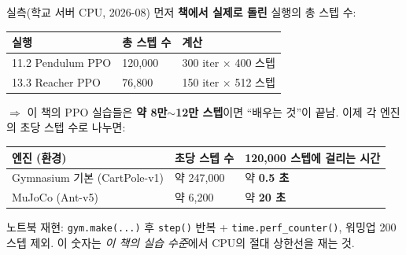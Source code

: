 \begin{frame}{실측(학교 서버 CPU, 2026-08)}
  먼저 \textbf{책에서 실제로 돌린} 실행의 총 스텝 수:
  \small
  \begin{tabular}{@{}p{4.4cm}p{3.0cm}p{6.0cm}@{}}
    \toprule
    실행 & 총 스텝 수 & 계산 \\
    \midrule
    11.2 Pendulum PPO & 120,000 & 300 iter $\times$ 400 스텝 \\
    13.3 Reacher PPO & 76,800 & 150 iter $\times$ 512 스텝 \\
    \bottomrule
  \end{tabular}
  $\Rightarrow$ 이 책의 PPO 실습들은 \textbf{약 8만$\sim$12만 스텝}이면
  ``배우는 것''이 끝남. 이제 각 엔진의 초당 스텝 수로 나누면:
  \small
  \begin{tabular}{@{}p{5.6cm}p{3.6cm}p{4.8cm}@{}}
    \toprule
    엔진 (환경) & 초당 스텝 수 & 120,000 스텝에 걸리는 시간 \\
    \midrule
    Gymnasium 기본 (CartPole-v1) & 약 247,000 & 약 \textbf{0.5 초} \\
    MuJoCo (Ant-v5) & 약 6,200 & 약 \textbf{20 초} \\
    \bottomrule
  \end{tabular}
  {\footnotesize 노트북 재현: \texttt{gym.make(...)} 후
  \texttt{step()} 반복 + \texttt{time.perf\_counter()}, 워밍업
  200스텝 제외. 이 숫자는 \textit{이 책의 실습 수준}에서 CPU의
  절대 상한선을 재는 것.}
\end{frame}
